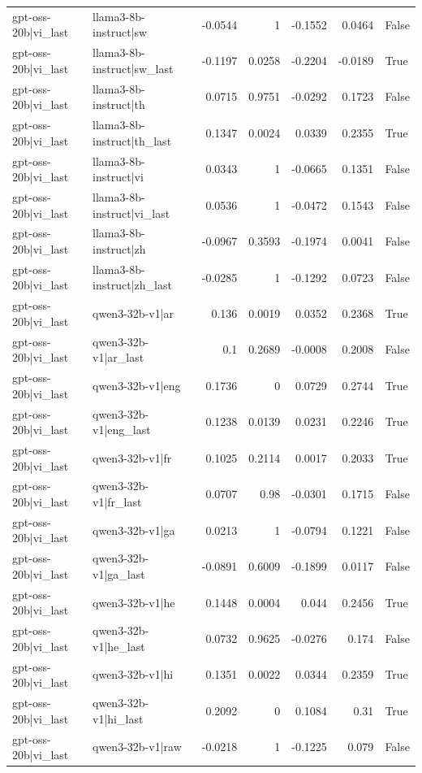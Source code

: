 \begin{table}
\begin{tabular}{l l r r r r l}
gpt-oss-20b|vi_last & llama3-8b-instruct|sw & -0.0544 & 1 & -0.1552 & 0.0464 & False \\
gpt-oss-20b|vi_last & llama3-8b-instruct|sw_last & -0.1197 & 0.0258 & -0.2204 & -0.0189 & True \\
gpt-oss-20b|vi_last & llama3-8b-instruct|th & 0.0715 & 0.9751 & -0.0292 & 0.1723 & False \\
gpt-oss-20b|vi_last & llama3-8b-instruct|th_last & 0.1347 & 0.0024 & 0.0339 & 0.2355 & True \\
gpt-oss-20b|vi_last & llama3-8b-instruct|vi & 0.0343 & 1 & -0.0665 & 0.1351 & False \\
gpt-oss-20b|vi_last & llama3-8b-instruct|vi_last & 0.0536 & 1 & -0.0472 & 0.1543 & False \\
gpt-oss-20b|vi_last & llama3-8b-instruct|zh & -0.0967 & 0.3593 & -0.1974 & 0.0041 & False \\
gpt-oss-20b|vi_last & llama3-8b-instruct|zh_last & -0.0285 & 1 & -0.1292 & 0.0723 & False \\
gpt-oss-20b|vi_last & qwen3-32b-v1|ar & 0.136 & 0.0019 & 0.0352 & 0.2368 & True \\
gpt-oss-20b|vi_last & qwen3-32b-v1|ar_last & 0.1 & 0.2689 & -0.0008 & 0.2008 & False \\
gpt-oss-20b|vi_last & qwen3-32b-v1|eng & 0.1736 & 0 & 0.0729 & 0.2744 & True \\
gpt-oss-20b|vi_last & qwen3-32b-v1|eng_last & 0.1238 & 0.0139 & 0.0231 & 0.2246 & True \\
gpt-oss-20b|vi_last & qwen3-32b-v1|fr & 0.1025 & 0.2114 & 0.0017 & 0.2033 & True \\
gpt-oss-20b|vi_last & qwen3-32b-v1|fr_last & 0.0707 & 0.98 & -0.0301 & 0.1715 & False \\
gpt-oss-20b|vi_last & qwen3-32b-v1|ga & 0.0213 & 1 & -0.0794 & 0.1221 & False \\
gpt-oss-20b|vi_last & qwen3-32b-v1|ga_last & -0.0891 & 0.6009 & -0.1899 & 0.0117 & False \\
gpt-oss-20b|vi_last & qwen3-32b-v1|he & 0.1448 & 0.0004 & 0.044 & 0.2456 & True \\
gpt-oss-20b|vi_last & qwen3-32b-v1|he_last & 0.0732 & 0.9625 & -0.0276 & 0.174 & False \\
gpt-oss-20b|vi_last & qwen3-32b-v1|hi & 0.1351 & 0.0022 & 0.0344 & 0.2359 & True \\
gpt-oss-20b|vi_last & qwen3-32b-v1|hi_last & 0.2092 & 0 & 0.1084 & 0.31 & True \\
gpt-oss-20b|vi_last & qwen3-32b-v1|raw & -0.0218 & 1 & -0.1225 & 0.079 & False \\

\end{tabular}
\end{table}
